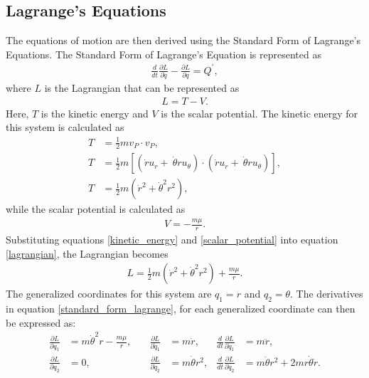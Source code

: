 \documentclass[]{article}
\begin{document}
\subsection{Lagrange's Equations}
The equations of motion are then derived using the Standard Form of Lagrange's Equations. The Standard Form of Lagrange's Equation is represented as
\begin{align}
	\frac{d}{dt}\frac{\partial L}{\partial \dot{q}} - \frac{\partial L}{\partial q} = Q^{'}, \label{standard_form_lagrange}
\end{align}
where \(L\) is the Lagrangian that can be represented as
\begin{align}
	L = T - V. \label{lagrangian}
\end{align}
Here, \(T\) is the kinetic energy and \(V\) is the scalar potential. The kinetic energy for this system is calculated as 
\begin{align}
	T &= \frac{1}{2}mv_{P} \cdot v_{P}, \nonumber\\
	T &= \frac{1}{2}m[(\dot{r}u_{r} +\ \dot{\theta}ru_{\theta}) \cdot (\dot{r}u_{r} +\ \dot{\theta}ru_{\theta})], \nonumber\\
	T &= \frac{1}{2}m(\dot{r}^2+\dot{\theta}^2r^2), \label{kinetic_energy}
\end{align}
while the scalar potential is calculated as
\begin{align}
	V = -\frac{m\mu}{r}. \label{scalar_potential}
\end{align}
Substituting equations \ref{kinetic_energy} and \ref{scalar_potential} into equation \ref{lagrangian}, the Lagrangian becomes
\begin{align}
	L = \frac{1}{2}m(\dot{r}^2+\dot{\theta}^2r^2) + \frac{m\mu}{r}. \label{lagrangian2}
\end{align}
 The generalized coordinates for this system are \(q_1 = r\) and \(q_2 = \theta\). The derivatives in equation \ref{standard_form_lagrange}, for each generalized coordinate can then be expressed as:
\begin{align*}
  \frac{\partial L}{\partial q_{1}} &= m\dot{\theta}^2r - \frac{m\mu}{r},\quad & \frac{\partial L}{\partial \dot{q}_{1}} &= m\dot{r},          & \frac{d}{dt}\frac{\partial L}{\partial \dot{q}_{1}} &= m\ddot{r}, \\
  \frac{\partial L}{\partial q_{2}} &= 0,\quad                                 & \frac{\partial L}{\partial \dot{q}_{2}} &= m\dot{\theta}r^2,  & \frac{d}{dt}\frac{\partial L}{\partial \dot{q}_{2}} &= m\ddot{\theta}r^2 + 2mr\dot{\theta}\dot{r}.
\end{align*}
\end{document}
